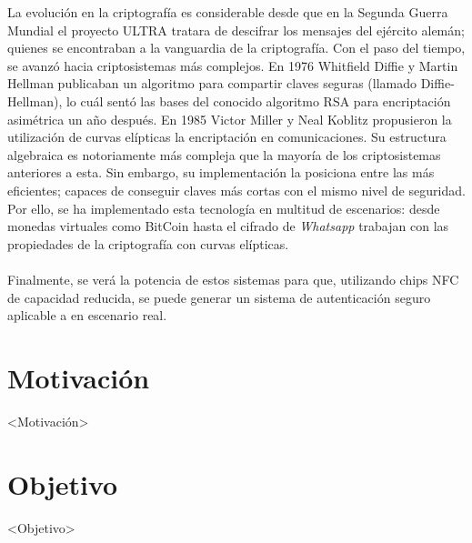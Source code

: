 \documentclass[../PFC.tex]{subfiles}
\begin{document}
La evolución en la criptografía es considerable desde que en la Segunda Guerra Mundial el proyecto ULTRA tratara de descifrar los mensajes del ejército alemán; quienes se encontraban a la vanguardia de la criptografía. Con el paso del tiempo, se avanzó hacia criptosistemas más complejos. En 1976 Whitfield Diffie y Martin Hellman publicaban un algoritmo para compartir claves seguras (llamado Diffie-Hellman)\cite{diffie1976new}, lo cuál sentó las bases del conocido algoritmo RSA \cite{rivest1978method} para encriptación asimétrica un año después. En 1985 Victor Miller y Neal Koblitz propusieron la utilización de curvas elípticas la encriptación en comunicaciones. Su estructura algebraica es notoriamente más compleja que la mayoría de los criptosistemas anteriores a esta. Sin embargo, su implementación la posiciona entre las más eficientes; capaces de conseguir claves más cortas con el mismo nivel de seguridad\cite{lucena}. Por ello, se ha implementado esta tecnología en multitud de escenarios: desde monedas virtuales como BitCoin hasta el cifrado de \textit{Whatsapp}\cite{whatsappEncryption} trabajan con las propiedades de la criptografía con curvas elípticas.
\\\\
Finalmente, se verá la potencia de estos sistemas para que, utilizando chips NFC de capacidad reducida, se puede generar un sistema de autenticación seguro aplicable a en escenario real.

\section{Motivación}
\label{Motivación}

<Motivación>

\section{Objetivo}
\label{Objetivo}

<Objetivo>
\end{document}
